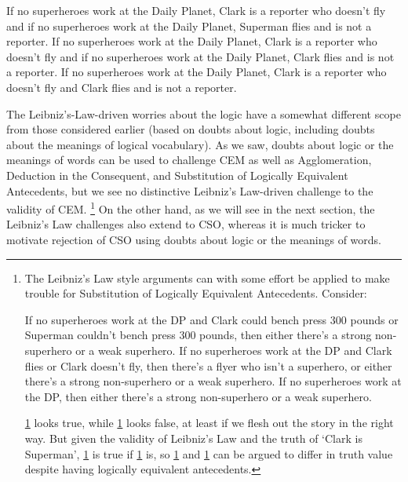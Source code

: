 \documentclass[If.tex]{subfiles}
\begin{document}
\begin{prop}
	\nitem
	\begin{prop}
		\aitem
		If no superheroes work at the Daily Planet, Clark is a reporter who doesn't fly and if no superheroes work at the Daily Planet, Superman flies and is not a reporter.
		\aitem
		If no superheroes work at the Daily Planet, Clark is a reporter who doesn't fly and if no superheroes work at the Daily Planet, Clark flies and is not a reporter.
		\aitem
		If no superheroes work at the Daily Planet, Clark is a reporter who doesn't fly and Clark flies and is not a reporter.
	\end{prop}
\end{prop}	

The Leibniz's-Law-driven worries about the logic have a somewhat different scope from those considered earlier (based on doubts about logic, including doubts about the meanings of logical vocabulary).  As we saw, doubts about logic or the meanings of words can be used to challenge CEM as well as Agglomeration, Deduction in the Consequent, and Substitution of Logically Equivalent Antecedents, but we see no distinctive Leibniz's Law-driven challenge to the validity of CEM.%
\footnote{The Leibniz's Law style arguments can with some effort be applied to make trouble for Substitution of Logically Equivalent Antecedents.  Consider:
	\begin{prop}
		\aitem \label{aa}
		If no superheroes work at the DP and Clark could bench press 300 pounds or Superman couldn't bench press 300 pounds, then either there's a strong non-superhero or a weak superhero. 
		\aitem \label{bb}
		If no superheroes work at the DP and Clark flies or Clark doesn't fly, then there's a flyer who isn't a superhero, or either there's a strong non-superhero or a weak superhero. 
		\aitem \label{cc}
		If no superheroes work at the DP, then either there's a strong non-superhero or a weak superhero. 
	\end{prop}
	\ref{aa} looks true, while \ref{cc} looks false, at least if we flesh out the story in the right way.  But given the validity of Leibniz's Law and the truth of ‘Clark is Superman’, \ref{bb} is true if \ref{aa} is, so \ref{bb} and \ref{cc} can be argued to differ in truth value despite having logically equivalent antecedents.}
On the other hand, as we will see in the next section, the Leibniz's Law challenges also extend to CSO, whereas it is much tricker to motivate rejection of CSO using doubts about logic or the meanings of words.  
\end{document}
